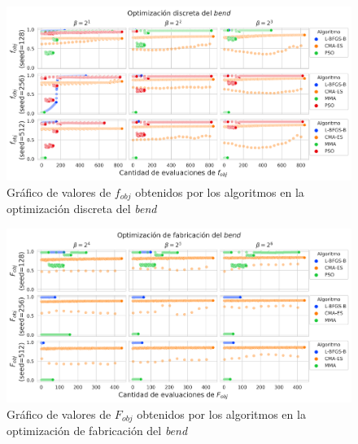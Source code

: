 \begin{landscape}
\begin{figure}[ht]
  \centering
  \includegraphics[scale=1.0]{image/results/bend/bend-opt-disc.png}
  \caption{Gráfico de valores de $f_{obj}$ obtenidos por los algoritmos en la optimización discreta del \emph{bend}}
  \label{fig:bend-disc}
\end{figure}
\end{landscape}

\begin{landscape}
\begin{figure}[ht]
  \centering
  \includegraphics[scale=1.0]{image/results/bend/bend-opt-fab.png}
  \caption{Gráfico de valores de $F_{obj}$ obtenidos por los algoritmos en la optimización de fabricación del \emph{bend}}
  \label{fig:bend-fab}
\end{figure}
\end{landscape}

